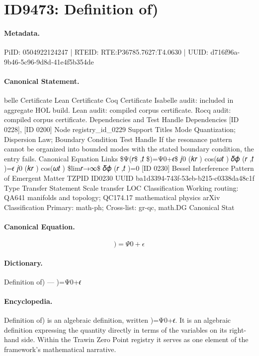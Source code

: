 \section*{ID9473: Definition of)}
\paragraph{Metadata.}
PiID: 0504922124247 | RTEID: RTE:P36785.7627:T4.0630 | UUID: d716f96a-9b46-5c96-9d8d-41e4f5b354de

\paragraph{Canonical Statement.}
belle Certificate Lean Certificate Coq Certificate Isabelle audit: included in aggregate HOL build. Lean audit: compiled corpus certificate. Rocq audit: compiled corpus certificate. Dependencies and Test Handle Dependencies [ID 0228], [ID 0200] Node registry\_id\_0229 Support Titles Mode Quantization; Dispersion Law; Boundary Condition Test Handle If the resonance pattern cannot be organized into bounded modes with the stated boundary condition, the entry fails. Canonical Equation Links \$Ψ(𝑟\$ ,𝑡 \$)=Ψ0+𝜖\$ 𝑗0 (𝑘𝑟 ) cos(𝜔𝑡 ) 𝛿𝜙 (𝑟 ,𝑡 )=𝜖 𝑗0 (𝑘𝑟 ) cos(𝜔𝑡 ) \$lim𝑟→∞\$ 𝛿𝜙 (𝑟 ,𝑡 )=0 [ID 0230] Bessel Interference Pattern of Emergent Matter TZPID ID0230 UUID ba1d3394-743f-53eb-b215-c0338da48c1f Type Transfer Statement Scale transfer LOC Classification Working routing: QA641 manifolds and topology; QC174.17 mathematical physics arXiv Classification Primary: math-ph; Cross-list: gr-qc, math.DG Canonical Stat

\paragraph{Canonical Equation.}
\[
)=Ψ0+𝜖
\]

\paragraph{Dictionary.}
Definition of) — )=Ψ0+𝜖

\paragraph{Encyclopedia.}
Definition of) is an algebraic definition, written )=Ψ0+𝜖. It is an algebraic definition expressing the quantity directly in terms of the variables on its right-hand side. Within the Trawin Zero Point registry it serves as one element of the framework's mathematical narrative.
